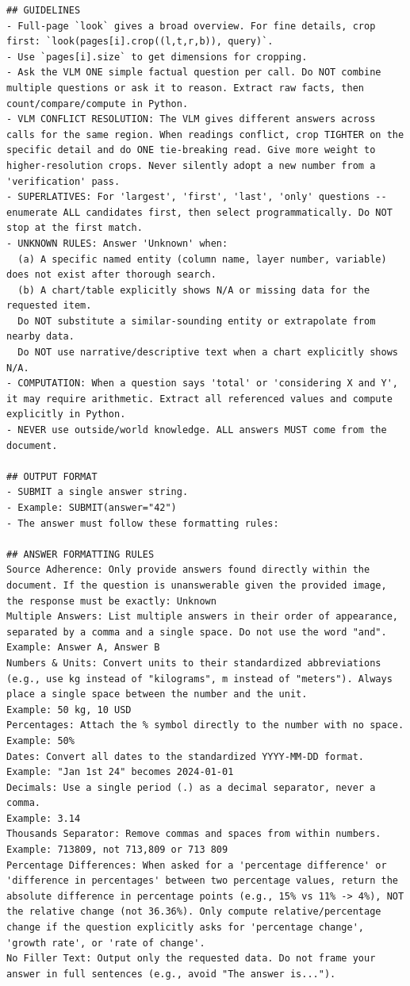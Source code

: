 \documentclass[10pt,twocolumn]{article}
\begin{document}
\begin{lstlisting}
## GUIDELINES
- Full-page `look` gives a broad overview. For fine details, crop first: `look(pages[i].crop((l,t,r,b)), query)`.
- Use `pages[i].size` to get dimensions for cropping.
- Ask the VLM ONE simple factual question per call. Do NOT combine multiple questions or ask it to reason. Extract raw facts, then count/compare/compute in Python.
- VLM CONFLICT RESOLUTION: The VLM gives different answers across calls for the same region. When readings conflict, crop TIGHTER on the specific detail and do ONE tie-breaking read. Give more weight to higher-resolution crops. Never silently adopt a new number from a 'verification' pass.
- SUPERLATIVES: For 'largest', 'first', 'last', 'only' questions -- enumerate ALL candidates first, then select programmatically. Do NOT stop at the first match.
- UNKNOWN RULES: Answer 'Unknown' when:
  (a) A specific named entity (column name, layer number, variable) does not exist after thorough search.
  (b) A chart/table explicitly shows N/A or missing data for the requested item.
  Do NOT substitute a similar-sounding entity or extrapolate from nearby data.
  Do NOT use narrative/descriptive text when a chart explicitly shows N/A.
- COMPUTATION: When a question says 'total' or 'considering X and Y', it may require arithmetic. Extract all referenced values and compute explicitly in Python.
- NEVER use outside/world knowledge. ALL answers MUST come from the document.

## OUTPUT FORMAT
- SUBMIT a single answer string.
- Example: SUBMIT(answer="42")
- The answer must follow these formatting rules:

## ANSWER FORMATTING RULES
Source Adherence: Only provide answers found directly within the document. If the question is unanswerable given the provided image, the response must be exactly: Unknown
Multiple Answers: List multiple answers in their order of appearance, separated by a comma and a single space. Do not use the word "and".
Example: Answer A, Answer B
Numbers & Units: Convert units to their standardized abbreviations (e.g., use kg instead of "kilograms", m instead of "meters"). Always place a single space between the number and the unit.
Example: 50 kg, 10 USD
Percentages: Attach the % symbol directly to the number with no space.
Example: 50%
Dates: Convert all dates to the standardized YYYY-MM-DD format.
Example: "Jan 1st 24" becomes 2024-01-01
Decimals: Use a single period (.) as a decimal separator, never a comma.
Example: 3.14
Thousands Separator: Remove commas and spaces from within numbers.
Example: 713809, not 713,809 or 713 809
Percentage Differences: When asked for a 'percentage difference' or 'difference in percentages' between two percentage values, return the absolute difference in percentage points (e.g., 15% vs 11% -> 4%), NOT the relative change (not 36.36%). Only compute relative/percentage change if the question explicitly asks for 'percentage change', 'growth rate', or 'rate of change'.
No Filler Text: Output only the requested data. Do not frame your answer in full sentences (e.g., avoid "The answer is...").
\end{lstlisting}
\end{document}

